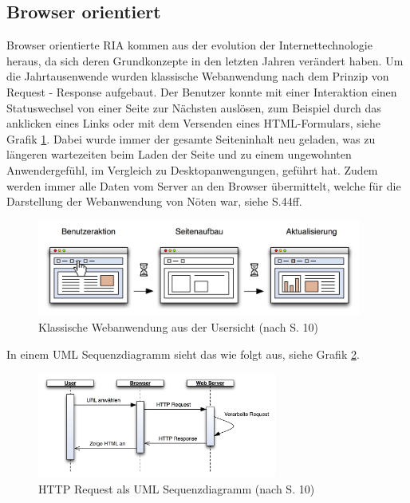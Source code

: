   \subsection{Browser orientiert}
  
  Browser orientierte \ac{RIA} kommen aus der evolution der Internettechnologie
  heraus, da sich deren Grundkonzepte in den letzten Jahren verändert haben. Um
  die Jahrtausenwende wurden klassische Webanwendung nach dem Prinzip von
  Request - Response aufgebaut. Der Benutzer konnte mit einer Interaktion einen
  Statuswechsel von einer Seite zur Nächsten auslösen, zum Beispiel durch das
  anklicken eines Links oder mit dem Versenden eines HTML-Formulars, siehe
  Grafik \ref{img:classicPageReload}. Dabei wurde immer der gesamte
  Seiteninhalt neu geladen, was zu längeren wartezeiten beim Laden der Seite
  und zu einem ungewohnten Anwendergefühl, im Vergleich zu Desktopanwengungen,
  geführt hat. Zudem werden immer alle Daten vom Server an den Browser
  übermittelt, welche für die Darstellung der Webanwendung von Nöten war, siehe
  \cite{AjaxInAction} S.44ff.
  
  \begin{figure}[h]
    \begin{center}
      \includegraphics[width=0.95\textwidth]{./image/classicPageReload.png}
      \caption{Klassische Webanwendung aus der Usersicht (nach
      \cite{DiplomarbeitStephanSchuster} S. 10)}
      \label{img:classicPageReload}
    \end{center}
  \end{figure}
  
  In einem \ac{UML} Sequenzdiagramm sieht das wie folgt aus, siehe Grafik
  \ref{img:sequenzdiagrammClassicPageReload}.
  
  \begin{figure}[h]
    \begin{center}
      \includegraphics[width=0.7\textwidth]{./image/sequenzdiagrammClassicPageReload.png}
      \caption{HTTP Request als \ac{UML} Sequenzdiagramm (nach
      \cite{HttpBasics} S. 10)}
      \label{img:sequenzdiagrammClassicPageReload}
    \end{center}
  \end{figure}
  

